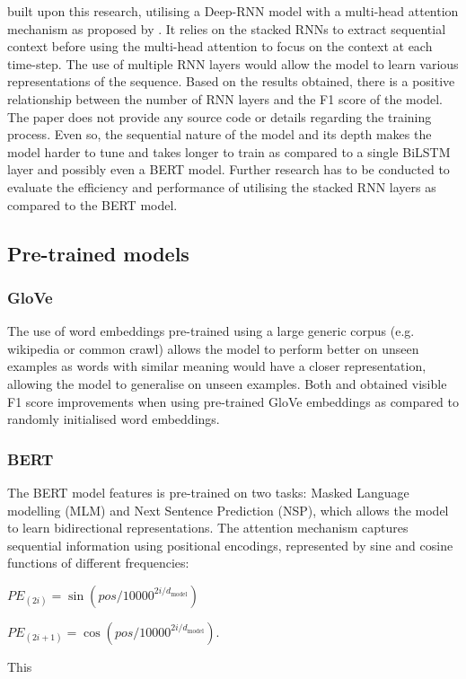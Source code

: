 \documentclass[a4paper]{article}
\begin{document}
\cite{kim_2019} built upon this research, utilising a Deep-RNN model with a multi-head attention mechanism as proposed by \cite{attentionisallyouneed}. It relies on the stacked RNNs to extract sequential context before using the multi-head attention to focus on the context at each time-step. The use of multiple RNN layers would allow the model to learn various representations of the sequence. Based on the results obtained, there is a positive relationship between the number of RNN layers and the F1 score of the model. The paper does not provide any source code or details regarding the training process. Even so, the sequential nature of the model and its depth makes the model harder to tune and takes longer to train as compared to a single BiLSTM layer and possibly even a BERT model. Further research has to be conducted to evaluate the efficiency and performance of utilising the stacked RNN layers as compared to the BERT model.

\subsection{Pre-trained models}
\subsubsection{GloVe}
The use of word embeddings pre-trained using a large generic corpus (e.g. wikipedia or common crawl) allows the model to perform better on unseen examples as words with similar meaning would have a closer representation, allowing the model to generalise on unseen examples.
Both \citet{birnnattention} and \citet{kim_2019} obtained visible F1 score improvements when using pre-trained GloVe \citep{glove} embeddings as compared to randomly initialised word embeddings. 
\subsubsection{BERT}
The BERT model features is pre-trained on two tasks: Masked Language modelling (MLM) and Next Sentence Prediction (NSP), which allows the model to learn bidirectional representations.
The attention mechanism captures sequential information using positional encodings, represented by sine and cosine functions of different frequencies: 

$PE_{(2i)} = \sin{(pos/10000^{2i/d_{\text{model}}})}$

$PE_{(2i+1)} = \cos{(pos/10000^{2i/d_{\text{model}}})}$. 

This 
\end{document}
